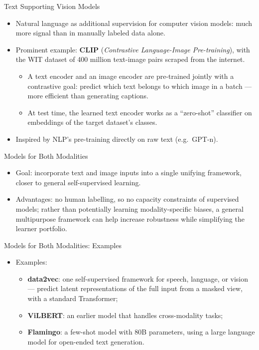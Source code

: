 \begin{frame}{Text Supporting Vision Models}
\begin{itemize}
  \item Natural language as additional supervision for computer vision models: much more signal than in manually labeled data alone.
  \item Prominent example: \textbf{CLIP} (\emph{Contrastive Language-Image Pre-training}), with the WIT dataset of 400 million text-image pairs scraped from the internet.
  \begin{itemize}
    \item A text encoder and an image encoder are pre-trained jointly with a contrastive goal: predict which text belongs to which image in a batch --- more efficient than generating captions.
    \item At test time, the learned text encoder works as a ``zero-shot'' classifier on embeddings of the target dataset's classes.
  \end{itemize}
  \item Inspired by NLP's pre-training directly on raw text (e.g.\ GPT-n).
\end{itemize}
\end{frame}

\begin{frame}{Models for Both Modalities}
\begin{itemize}
  \item Goal: incorporate text and image inputs into a single unifying framework, closer to general self-supervised learning.
  \item Advantages: no human labelling, so no capacity constraints of supervised models; rather than potentially learning modality-specific biases, a general multipurpose framework can help increase robustness while simplifying the learner portfolio.
\end{itemize}
\end{frame}

\begin{frame}{Models for Both Modalities: Examples}
\begin{itemize}
  \item Examples:
  \begin{itemize}
    \item \textbf{data2vec}: one self-supervised framework for speech, language, or vision --- predict latent representations of the full input from a masked view, with a standard Transformer;
    \item \textbf{ViLBERT}: an earlier model that handles cross-modality tasks;
    \item \textbf{Flamingo}: a few-shot model with 80B parameters, using a large language model for open-ended text generation.
  \end{itemize}
\end{itemize}
\end{frame}

